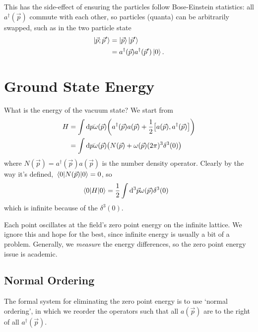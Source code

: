 \documentclass[notes.tex]{subfiles}
\begin{document}
This has the side-effect of ensuring the particles follow Bose-Einstein statistics: all $a^\dagger(\vec{p})$ commute with each other, so particles (quanta) can be arbitrarily swapped, such as in the two particle state 
\begin{align*}
    \ket{\vec{p}; \vec{p}^\prime} &= \ket{\vec{p}}\ket{\vec{p}^\prime}\\
    &= a^\dagger(\vec{p}) a^\dagger(\vec{p}^\prime)\ket{0}.
\end{align*}

\section{Ground State Energy}
What is the energy of the vacuum state? We start from
\begin{align*}
    H &= \int\dds{p} \omega(\vec{p})\qty(a^\dagger(\vec{p}) a(\vec{p}) + \half{}\commutator{a(\vec{p})}{a^\dagger(\vec{p})})\\
    &= \int \dds{p}\omega(\vec{p})\qty(N(\vec{p}) + \omega(\vec{p})(2\pi)^3 \delta^3(0))
\end{align*}
where $N(\vec{p})=a^\dagger(\vec{p}) a(\vec{p})$ is the number density operator. 
Clearly by the way it's defined, $\mel{0}{N(\vec{p})}{0} = 0$, so 
\begin{align*}
    \mel{0}{H}{0} &= \frac{1}{2}{}\int\dd[3]\vec{p} \omega(\vec{p}) \delta^3(0)
\end{align*}
which is infinite because of the $\delta^3(0)$.

Each point oscillates at the field's zero point energy on the infinite lattice. We ignore this and hope for the best, since infinite energy is usually a bit of a problem. Generally, we \emph{measure} the energy differences, so the zero point energy issue is academic.

\subsection{Normal Ordering}
The formal system for eliminating the zero point energy is to use `normal ordering', in which we reorder the operators such that all $a(\vec{p})$ are to the right of all $a^\dagger(\vec{p})$. 
\end{document}
